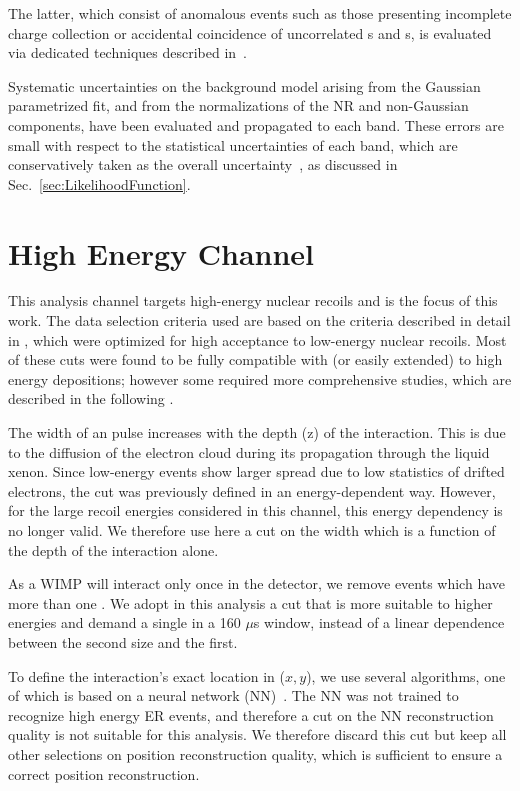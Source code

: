 The latter, which consist of anomalous events such as those 
presenting incomplete charge collection or accidental coincidence of uncorrelated \Si{}s and \Sii{}s,  
is evaluated via dedicated techniques described in~\cite{xe100_run_combination}.

Systematic uncertainties on the background model arising from the Gaussian parametrized fit, and from the normalizations of the NR and non-Gaussian components, have been evaluated and propagated to each band. 
These errors are small with respect to the statistical uncertainties of each band, which are conservatively taken as the overall uncertainty~\cite{xe100_run_combination}, as discussed in Sec.~\ref{sec:LikelihoodFunction}.



\section{High Energy Channel}
\label{subsubsec:HighE}
This analysis channel targets high-energy nuclear recoils and is the focus of this work. The data selection criteria used are based on the criteria described in detail in \cite{Aprile:2012vw}, which were optimized for high acceptance to low-energy nuclear recoils. Most of these cuts were found to be fully compatible with (or easily extended) to high energy depositions; however some required more comprehensive studies, which are described in the following . 

The width of an \Sii{} pulse increases with the depth (z) of the interaction. This is due to the diffusion of the electron cloud during its propagation
through the liquid xenon. Since low-energy \Sii{} events show larger spread
due to low statistics of drifted electrons, the cut was previously defined in an energy-dependent way. However, for the large recoil energies considered in this channel, this energy dependency is no longer valid. We therefore use here a cut on the \Sii{} width which is a function of the depth of the interaction alone. 

As a WIMP will interact only once in the detector, we remove events which have more than one \Sii{}. We adopt in this analysis a cut that is more suitable to higher energies and demand a single \Sii{} in a 160 $\mu$s window, instead of a linear dependence between the second \Sii{} size and the first. 

To define the interaction's exact location in ($x,y$), we use several algorithms, one of which is based on a neural network (NN)~\cite{Aprile:2012vw}. The NN was not trained to recognize high energy ER events, and therefore a cut on the NN reconstruction quality is not suitable for this analysis. We therefore discard this cut but keep all other selections on position reconstruction quality, which is sufficient to ensure a correct position reconstruction. 

